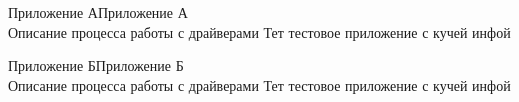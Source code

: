 \documentclass[]{../vvsu}
\begin{document}

\begin{application}{Приложение А}{Приложение А\\ \vspace{1em} Описание процесса работы с драйверами}
  Тет тестовое приложение с кучей инфой
\end{application}

\begin{application}{Приложение Б}{Приложение Б\\ \vspace{1em} Описание процесса работы с драйверами}
  Тет тестовое приложение с кучей инфой
\end{application}
\end{document}

